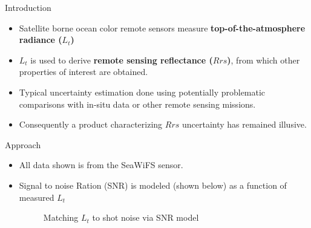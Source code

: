 \documentclass[final]{beamer}
\newlength{\onecolwid}
\begin{document}
\begin{frame}[t]
\begin{columns}[t]
\begin{column}{\onecolwid}
\begin{block}{Introduction}
\begin{itemize}
\item Satellite borne ocean color remote sensors measure \textbf{top-of-the-atmosphere radiance ($L_t$)}
\item $L_t$ is used to derive \textbf{remote sensing reflectance ($Rrs$)}, from which other  properties of interest are obtained.
\item Typical uncertainty estimation done using potentially problematic comparisons with in-situ data or other remote sensing missions\cite{BW:2006,Tle:2000,Hu:2013}.
\item Consequently a product characterizing $Rrs$ uncertainty has remained illusive.
\end{itemize}
\end{block}



\begin{block}{Approach}
\begin{itemize}
\item All data shown is from the SeaWiFS sensor.
\item Signal to noise Ration (SNR) is modeled (shown below) as a function of measured $L_t$
\begin{figure}
\centering
\caption{Matching $L_t$ to shot noise via SNR model}


\end{figure}
\end{itemize}
\end{block}
\end{column}
\end{columns}
\end{frame}
\end{document}
